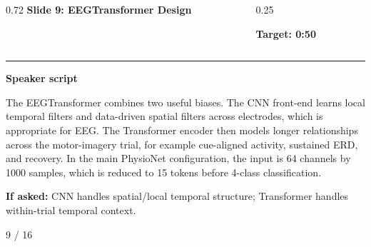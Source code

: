 \documentclass[aspectratio=169,10pt]{beamer}
\begin{document}
\begin{frame}[plain]
\vspace*{0.16cm}
\begin{columns}[T,totalwidth=\textwidth]
\begin{column}{0.72\textwidth}
{\fontsize{17}{18.5}\selectfont\bfseries Slide 9: EEGTransformer Design}
\end{column}
\begin{column}{0.25\textwidth}
\raggedleft
\colorbox{noteCream}{\parbox{0.88\linewidth}{\centering\bfseries Target: 0:50}}
\end{column}
\end{columns}
\vspace{0.10cm}
{\color{uomPurple}\rule{\textwidth}{1.2pt}}
\vspace{0.18cm}
{\color{uomPurple}\bfseries Speaker script}
\vspace{0.06cm}
\setlength{\fboxsep}{6pt}
\noindent\colorbox{panelGrey}{\begin{minipage}{0.94\textwidth}
\justifying\fontsize{11.0}{13.4}\selectfont
The EEGTransformer combines two useful biases. The CNN front-end learns local temporal filters and data-driven spatial filters across electrodes, which is appropriate for EEG. The Transformer encoder then models longer relationships across the motor-imagery trial, for example cue-aligned activity, sustained ERD, and recovery. In the main PhysioNet configuration, the input is 64 channels by 1000 samples, which is reduced to 15 tokens before 4-class classification.
\end{minipage}}
\vspace{0.22cm}
\noindent\colorbox{noteCream}{\begin{minipage}{0.94\textwidth}
\fontsize{9.6}{11.6}\selectfont
{\bfseries If asked:} CNN handles spatial/local temporal structure; Transformer handles within-trial temporal context.
\end{minipage}}
\vfill
\hfill{\color{textDark}\scriptsize 9 / 16}
\end{frame}
\end{document}
